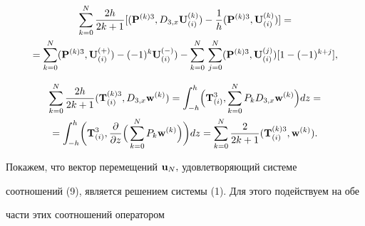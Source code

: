 \begin{multline*} 


\sum^N_{k=0}\frac{2h}{2k+1} 


[({\bold P}^{(k)3},D_{3,x}{\bold U}^{(k)}_{(i)})-\frac{1}{h}


({\bold P}^{(k)3},{\bold U}^{(k)}_{(i)})]= \\ 


%


=\sum^N_{k=0}({\bold P}^{(k)3},{\bold U}^{(+)}_{(i)})- 


(-1)^k{\bold U}^{(-)}_{(i)})- 


\sum^N_{k=0}\,\sum^N_{j=0} 


({\bold P}^{(k)3},{\bold U}^{(j)}_{(i)})[1-(-1)^{k+j}], 


\end{multline*} 


%


\begin{multline*}


\sum^N_{k=0}\frac{2h}{2k+1}({\bold T}_{(i)}^{(k)3},D_{3,x}


{\bold w^{(k)}})=\int^h_{-h}\Bigl({\bold T^3_{(i)}},


\sum^N_{k=0}P_k D_{3,x}{\bold w^{(k)}}\Bigr)dz= \\


%


=\int^h_{-h}\biggl({\bold T^3_{(i)}},\frac{\partial}{\partial z}


\Bigl(\,\sum^N_{k=0}P_k {\bold w^{(k)}}\Bigr)\biggr)dz=


\sum^N_{k=0}\frac{2}{2k+1}({\bold T}_{(i)}^{(k)3},{\bold w^{(k)}}).


\end{multline*}


 


Покажем, что вектор перемещений ${\bold u}_N,$ удовлетворяющий системе 


соотношений (9), является решением системы (1). Для этого подействуем на обе 


части этих соотношений оператором 


